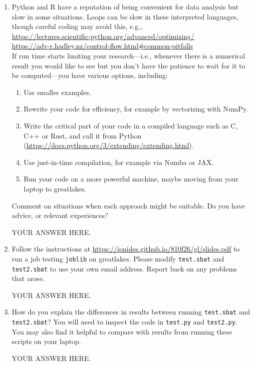 \documentclass[12pt]{article}
\begin{document}
\begin{enumerate}

\item Python and R have a reputation of being convenient for data analysis but slow in some situations. Loops can be slow in these interpreted languages, though careful coding may avoid this, e.g.,\\
\url{https://lectures.scientific-python.org/advanced/optimizing/}\\
\url{https://adv-r.hadley.nz/control-flow.html#common-pitfalls}\\
If run time starts limiting your research---i.e., whenever there is a numerical result you would like to see but you don't have the patience to wait for it to be computed---you have various options, including:
  \begin{enumerate}
  \item Use smaller examples.
  \item Rewrite your code for efficiency, for example by vectorizing with NumPy.
  \item Write the critical part of your code in a compiled language such as C, C++ or Rust, and call it from Python\\
    (\url{https://docs.python.org/3/extending/extending.html}).
  \item Use just-in-time compilation, for example via Numba or JAX.
  \item Run your code on a more powerful machine, maybe moving from your laptop to greatlakes.
  \end{enumerate}
Comment on situations when each approach might be suitable. Do you have advice, or relevant experiences?

YOUR ANSWER HERE.

\item Follow the instructions at \url{https://ionides.github.io/810f26/gl/slides.pdf} to run a job testing \texttt{joblib} on greatlakes. Please modify \texttt{test.sbat} and \texttt{test2.sbat} to use your own email address. Report back on any problems that arose.

YOUR ANSWER HERE.

\item How do you explain the differences in results between running \texttt{test.sbat} and \texttt{test2.sbat}? You will need to inspect the code in \texttt{test.py} and \texttt{test2.py}. You may also find it helpful to compare with results from running these scripts on your laptop.

YOUR ANSWER HERE.

\end{enumerate}
\end{document}
